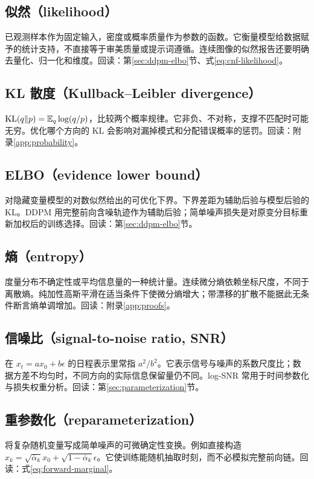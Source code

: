 \subsection*{似然（likelihood）}\label{gl:likelihood}
已观测样本作为固定输入，密度或概率质量作为参数的函数。它衡量模型给数据赋予的统计支持，不直接等于审美质量或提示词遵循。连续图像的似然报告还要明确去量化、归一化和维度。回读：第\ref{sec:ddpm-elbo}节、式\eqref{eq:cnf-likelihood}。

\subsection*{KL 散度（Kullback--Leibler divergence）}\label{gl:kl}
$\operatorname{KL}(q\Vert p)=\mathbb{E}_q\log(q/p)$，比较两个概率规律。它非负、不对称，支撑不匹配时可能无穷。优化哪个方向的 KL 会影响对漏掉模式和分配错误概率的惩罚。回读：附录\ref{app:probability}。

\subsection*{ELBO（evidence lower bound）}\label{gl:elbo}
对隐藏变量模型的对数似然给出的可优化下界。下界差距为辅助后验与模型后验的 KL。DDPM 用完整前向含噪轨迹作为辅助后验；简单噪声损失是对原变分目标重新加权后的训练选择。回读：第\ref{sec:ddpm-elbo}节。

\subsection*{熵（entropy）}\label{gl:entropy}
度量分布不确定性或平均信息量的一种统计量。连续微分熵依赖坐标尺度，不同于离散熵。纯加性高斯平滑在适当条件下使微分熵增大；带漂移的扩散不能据此无条件断言熵单调增加。回读：附录\ref{app:proofs}。

\subsection*{信噪比（signal-to-noise ratio, SNR）}\label{gl:snr}
在 $x_t=ax_0+b\epsilon$ 的日程表示里常指 $a^2/b^2$。它表示信号与噪声的系数尺度比；数据方差不均匀时，不同方向的实际信息保留量仍不同。log-SNR 常用于时间参数化与损失权重分析。回读：第\ref{sec:parameterization}节。

\subsection*{重参数化（reparameterization）}\label{gl:reparameterization}
将复杂随机变量写成简单噪声的可微确定性变换。例如直接构造 $x_k=\sqrt{\bar\alpha_k}x_0+\sqrt{1-\bar\alpha_k}\epsilon$。它使训练能随机抽取时刻，而不必模拟完整前向链。回读：式\eqref{eq:forward-marginal}。

